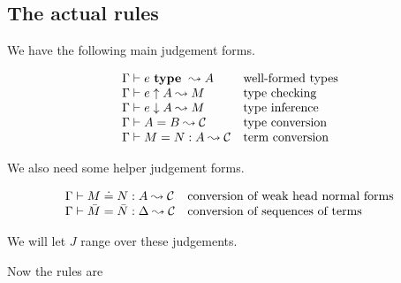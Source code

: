 
\subsection{The actual rules}

We have the following main judgement forms.

\[\begin{array}{ll}
    {\Gamma} \vdash {e} ~ \mathbf{type} ~ \leadsto {A} & \mbox{well-formed types} \\
    {\Gamma} \vdash {e} \uparrow {A} \leadsto {M} & \mbox{type checking} \\
    {\Gamma} \vdash {e} \downarrow {A} \leadsto {M} & \mbox{type inference} \\
    {\Gamma} \vdash {A} = {B} \leadsto {\mathcal{C}} & \mbox{type conversion} \\
    {\Gamma} \vdash {M} = {N} : {A} \leadsto {\mathcal{C}} & \mbox{term conversion} \\
\end{array}\]

We also need some helper judgement forms.

\[\begin{array}{ll}
    {\Gamma} \vdash {M} \doteq {N} : {A} \leadsto {\mathcal{C}} & \mbox{conversion of weak head normal forms} \\
    {\Gamma} \vdash {\bar M} = {\bar N} : {\Delta} \leadsto {\mathcal{C}} & \mbox{conversion of sequences of terms} \\
\end{array}\]

We will let $J$ range over these judgements.

Now the rules are



